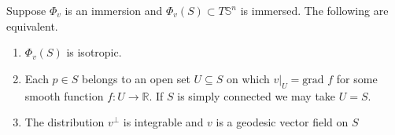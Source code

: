 \documentclass[12pt]{amsart}
\theoremstyle{plain}
\newenvironment{Mainthm}[1]{%
  \IfBlankTF{#1}
    {\renewcommand{\theMainthminner}{\unskip}}
    {\renewcommand\theMainthminner{#1}}%
  \Mainthminner
}{\endMainthminner}
\theoremstyle{definition}
\def\S{\mathbb{S}}
\numberwithin{equation}{section}
\begin{document}
\begin{Mainthm}{1}\label{thm: Characterisations of Isotropic For Tangent Lines}
Suppose $\Phi_v$ is an immersion and $\Phi_v(S)\subset T\S^n$ is immersed. The following are equivalent.
    \begin{enumerate}[label=(\alph*), itemsep=4pt, topsep=4pt]
        \item $\Phi_v(S)$ is isotropic.
        \item Each $p\in S$ belongs to an open set $U\subseteq S$ on which $v|_U=\mbox{grad~}f$ for some smooth function $f:U\to \mathbb{R}$. If $S$ is simply connected we may take $U=S$.
        \item The distribution $v^\bot$ is integrable and $v$ is a geodesic vector field on $S$
    \end{enumerate}
\end{Mainthm}
\end{document}
